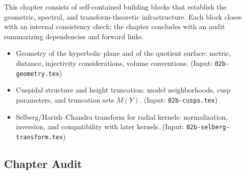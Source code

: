 This chapter consists of self-contained building blocks that establish the
geometric, spectral, and transform-theoretic infrastructure. Each block
closes with an internal consistency check; the chapter concludes with an
audit summarizing dependencies and forward links.

\begin{itemize}[leftmargin=2em]
  \item Geometry of the hyperbolic plane and of the quotient surface:
  metric, distance, injectivity considerations, volume conventions.
  (Input: \texttt{02b-geometry.tex})

  \item Cuspidal structure and height truncation:
  model neighborhoods, cusp parameters, and truncation sets $M(Y)$.
  (Input: \texttt{02b-cusps.tex})

  \item Selberg/Harish–Chandra transform for radial kernels:
  normalization, inversion, and compatibility with later kernels.
  (Input: \texttt{02b-selberg-transform.tex})

\end{itemize}








\subsection*{Chapter Audit}

